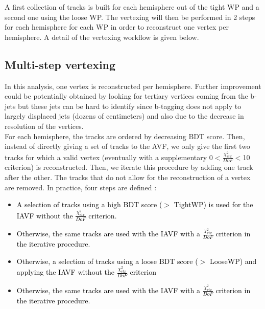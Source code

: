\documentclass{cernatlasnote}
\begin{document}
     A first collection of tracks is built for each hemisphere out of the tight WP and a second one using the loose WP. The vertexing will then be performed in 2 steps for each hemisphere for each WP in order to reconstruct one vertex per hemisphere. A detail of the vertexing workflow is given below.
    
    \subsection{Multi-step vertexing}
        In this analysis, one vertex is reconstructed per hemisphere. Further improvement could be potentially obtained by looking for tertiary vertices coming from the b-jets but these jets can be hard to identify since b-tagging does not apply to largely displaced jets (dozens of centimeters) and also due to the decrease in resolution of the vertices.\\

        For each hemisphere, the tracks are ordered by decreasing BDT score. Then, instead of directly giving a set of tracks to the AVF, we only give the first two tracks for which a valid vertex (eventually with a supplementary 0$<\frac{\chi^2_{vtx}}{DoF}<$10 criterion) is reconstructed. Then, we iterate this procedure by adding one track after the other. The tracks that do not allow for the reconstruction of a vertex are removed. In practice, four steps are defined :
    \begin{itemize}
        \item \textcolor{black}{ A selection of tracks using a high BDT score ($>$ TightWP) is used for the IAVF without the $\frac{\chi^2_{vtx}}{DoF}$ criterion.}
        \item \textcolor{black}{ Otherwise, the same tracks are used with the IAVF with a $\frac{\chi^2_{vtx}}{DoF}$ criterion in the iterative procedure.}
        \item \textcolor{black}{ Otherwise, a selection of tracks using a loose BDT score ($>$ LooseWP) and applying the IAVF without the $\frac{\chi^2_{vtx}}{DoF}$ criterion}
        \item  \textcolor{black}{ Otherwise, the same tracks are used with the IAVF with a $\frac{\chi^2_{vtx}}{DoF}$ criterion in the iterative procedure.}
    \end{itemize}
\end{document}
